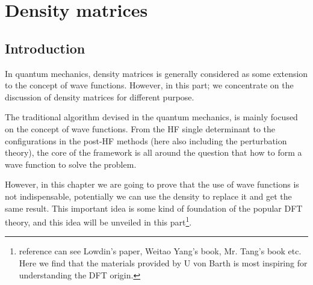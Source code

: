 %
%


%
%


\chapter{Density matrices}
%
%
%
%
%
\section{Introduction}
%
%
%
In quantum mechanics, density matrices is generally considered as some
extension to the concept of wave functions\cite{Landau}.  However, in
this part; we concentrate on the discussion of density matrices for
different purpose.

The traditional algorithm devised in the quantum mechanics, is mainly
focused on the concept of wave functions. From the HF single
determinant to the configurations in the post-HF methods (here also
including the perturbation theory), the core of the framework is all
around the question that how to form a wave function to solve the
problem.

However, in this chapter we are going to prove that the use of wave
functions is not indispensable, potentially we can use the density to
replace it and get the same result. This important idea is some kind
of foundation of the popular DFT theory, and this idea will be
unveiled in this part\footnote{reference can see Lowdin's
  paper\cite{Lowdin1,Lowdin2,Lowdin3}, Weitao Yang's
  book\cite{weitaoYang}, Mr. Tang's book \cite{aoqingTang} etc. Here
  we find that the materials provided by U von
  Barth\cite{2004PhST..109....9V} is most inspiring for understanding
  the DFT origin.}.


